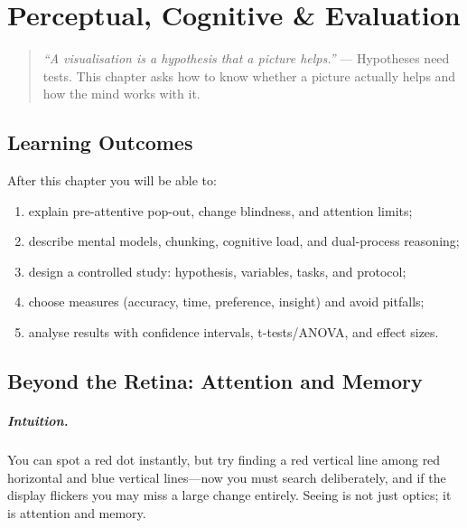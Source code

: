 \chapter{Perceptual, Cognitive \& Evaluation}
\label{ch:perception-evaluation}
\sloppy

\begin{quote}
\emph{``A visualisation is a hypothesis that a picture helps.''} --- Hypotheses need tests. This chapter asks how to know whether a picture actually helps and how the mind works with it.
\end{quote}

\noindent{}
\vspace{0.4em}

\section*{Learning Outcomes}
After this chapter you will be able to:
\begin{enumerate}[label=(L\arabic*)]
    \item explain pre-attentive pop-out, change blindness, and attention limits;
    \item describe mental models, chunking, cognitive load, and dual-process reasoning;
    \item design a controlled study: hypothesis, variables, tasks, and protocol;
    \item choose measures (accuracy, time, preference, insight) and avoid pitfalls;
    \item analyse results with confidence intervals, t-tests/ANOVA, and effect sizes.
\end{enumerate}

\section{Beyond the Retina: Attention and Memory}
\label{sec:beyond-retina}
\paragraph{Intuition.} You can spot a red dot instantly, but try finding a red vertical line among red horizontal and blue vertical lines---now you must search deliberately, and if the display flickers you may miss a large change entirely. Seeing is not just optics; it is attention and memory.

